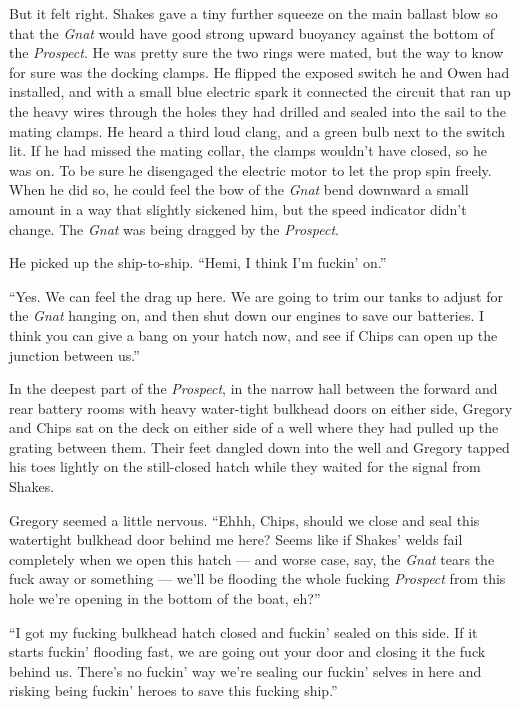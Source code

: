 \documentclass[
]{scrbook}
\begin{document}
But it felt right. Shakes gave a tiny further squeeze on the main
ballast blow so that the \emph{Gnat} would have good strong upward
buoyancy against the bottom of the \emph{Prospect}. He was pretty sure
the two rings were mated, but the way to know for sure was the docking
clamps. He flipped the exposed switch he and Owen had installed, and
with a small blue electric spark it connected the circuit that ran up
the heavy wires through the holes they had drilled and sealed into the
sail to the mating clamps. He heard a third loud clang, and a green bulb
next to the switch lit. If he had missed the mating collar, the clamps
wouldn't have closed, so he was on. To be sure he disengaged the
electric motor to let the prop spin freely. When he did so, he could
feel the bow of the \emph{Gnat} bend downward a small amount in a way
that slightly sickened him, but the speed indicator didn't change. The
\emph{Gnat} was being dragged by the \emph{Prospect}.

He picked up the ship-to-ship. ``Hemi, I think I'm fuckin' on.''

``Yes. We can feel the drag up here. We are going to trim our tanks to
adjust for the \emph{Gnat} hanging on, and then shut down our engines to
save our batteries. I think you can give a bang on your hatch now, and
see if Chips can open up the junction between us.''

In the deepest part of the \emph{Prospect}, in the narrow hall between
the forward and rear battery rooms with heavy water-tight bulkhead doors
on either side, Gregory and Chips sat on the deck on either side of a
well where they had pulled up the grating between them. Their feet
dangled down into the well and Gregory tapped his toes lightly on the
still-closed hatch while they waited for the signal from Shakes.

Gregory seemed a little nervous. ``Ehhh, Chips, should we close and seal
this watertight bulkhead door behind me here? Seems like if Shakes'
welds fail completely when we open this hatch --- and worse case, say,
the \emph{Gnat} tears the fuck away or something --- we'll be flooding
the whole fucking \emph{Prospect} from this hole we're opening in the
bottom of the boat, eh?''

``I got my fucking bulkhead hatch closed and fuckin' sealed on this
side. If it starts fuckin' flooding fast, we are going out your door and
closing it the fuck behind us. There's no fuckin' way we're sealing our
fuckin' selves in here and risking being fuckin' heroes to save this
fucking ship.''
\end{document}
